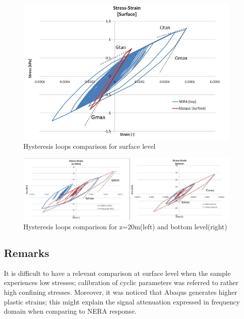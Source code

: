 	\begin{figure}[h!]
		\centering
		\includegraphics[width=0.7\linewidth]{"tau_gamma1"}
		\caption{Hysteresis loops comparison for surface level}
		\label{tau_gamma1}
	\end{figure}
	
	\begin{figure}[h!]
		\centering
		\includegraphics[width=0.7\linewidth]{"tau_gamma2"}
		\caption{Hysteresis loops comparison for z=20m(left) and bottom level(right)}
		\label{tau_gamma2}
	\end{figure}
	
	\subsection{Remarks}
	It is difficult to have a relevant comparison at surface level when the sample experiences low stresses; calibration of cyclic parameters was referred to rather high confining stresses. Moreover, it was noticed that Abaqus generates higher plastic strains; this might explain the signal attenuation expressed in frequency domain when comparing to NERA response. 
	
